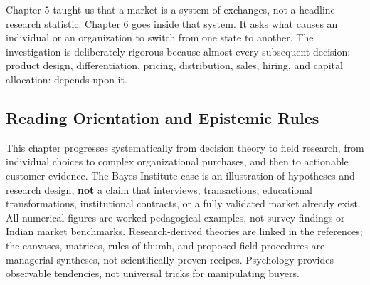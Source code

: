 Chapter 5 taught us that a market is a system of exchanges, not a headline research statistic. Chapter 6 goes inside that system. It asks what causes an individual or an organization to switch from one state to another. The investigation is deliberately rigorous because almost every subsequent decision: product design, differentiation, pricing, distribution, sales, hiring, and capital allocation: depends upon it.

\subsection*{Reading Orientation and Epistemic Rules}

This chapter progresses systematically from decision theory to field research, from individual choices to complex organizational purchases, and then to actionable customer evidence. The Bayes Institute case is an illustration of hypotheses and research design, \textbf{not} a claim that interviews, transactions, educational transformations, institutional contracts, or a fully validated market already exist. All numerical figures are worked pedagogical examples, not survey findings or Indian market benchmarks. Research-derived theories are linked in the references; the canvases, matrices, rules of thumb, and proposed field procedures are managerial syntheses, not scientifically proven recipes. Psychology provides observable tendencies, not universal tricks for manipulating buyers.

